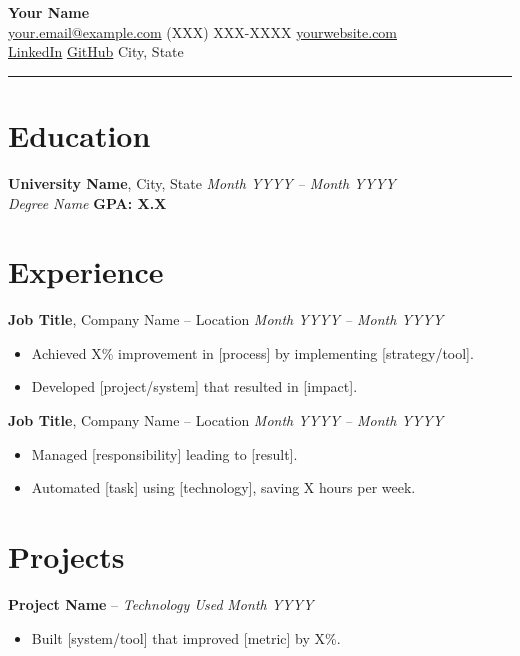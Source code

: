 \documentclass[a4paper,9pt]{article}
\begin{document}
\begin{center}
    {\Huge \textbf{Your Name}}\\[2pt]
    \href{mailto:your.email@example.com}{your.email@example.com} \textbar{} (XXX) XXX-XXXX \textbar{} \href{https://yourwebsite.com}{yourwebsite.com}\\[2pt]
    \href{https://linkedin.com/in/yourprofile}{LinkedIn} \textbar{} \href{https://github.com/yourgithub}{GitHub} \textbar{} City, State
\end{center}

\vspace{-6pt}
\noindent\rule{\textwidth}{0.6mm}
\vspace{-6pt}

\section*{Education}
\textbf{University Name}, City, State \hfill \textit{Month YYYY – Month YYYY}\\
\textit{Degree Name} \hfill \textbf{GPA: X.X}

\section*{Experience}
\textbf{Job Title}, Company Name – Location \hfill \textit{Month YYYY – Month YYYY}\\
\begin{itemize} 
    \item Achieved X\% improvement in [process] by implementing [strategy/tool].
    \item Developed [project/system] that resulted in [impact].
\end{itemize}

\textbf{Job Title}, Company Name – Location \hfill \textit{Month YYYY – Month YYYY}\\
\begin{itemize} 
    \item Managed [responsibility] leading to [result].
    \item Automated [task] using [technology], saving X hours per week.
\end{itemize}

\section*{Projects}
\textbf{Project Name} – \textit{Technology Used} \hfill \textit{Month YYYY}\\
\begin{itemize}
    \item Built [system/tool] that improved [metric] by X\%.
\end{itemize}
\end{document}
